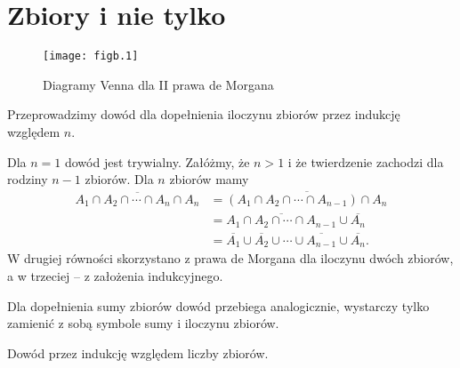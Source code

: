 \chapter{Zbiory i nie tylko}


\exercise{} %
\begin{figure}[ht]
	\begin{center}
		\texttt{[image: figb.1]}
	\end{center}
	\caption{Diagramy Venna dla II prawa de Morgana}
\end{figure}

\exercise{} %
Przeprowadzimy dowód dla dopełnienia iloczynu zbiorów przez indukcję względem $n$.

Dla $n=1$ dowód jest trywialny. Załóżmy, że $n>1$ i że twierdzenie zachodzi dla rodziny $n-1$ zbiorów. Dla $n$ zbiorów mamy
\begin{align*}
	\overline{A_1\cap A_2\cap\cdots\cap A_n\cap A_n} &= \overline{(A_1\cap A_2\cap\cdots\cap A_{n-1})\cap A_n} \\
	&= \overline{A_1\cap A_2\cap\cdots\cap A_{n-1}}\cup\overline{A_n} \\
	&= \overline{A_1}\cup\overline{A_2}\cup\cdots\cup\overline{A_{n-1}}\cup\overline{A_n}.
\end{align*}
W drugiej równości skorzystano z prawa de Morgana dla iloczynu dwóch zbiorów, a w trzeciej -- z założenia indukcyjnego.

Dla dopełnienia sumy zbiorów dowód przebiega analogicznie, wystarczy tylko zamienić z sobą symbole sumy i iloczynu zbiorów.

\exercise{} %
Dowód przez indukcję względem liczby zbiorów.

